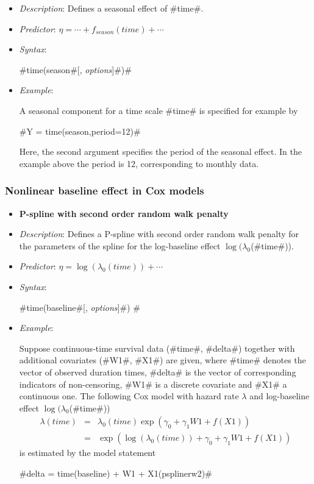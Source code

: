 \begin{itemize}
\item[] {\em Description}: Defines a seasonal effect of #time#.
\item[] {\em Predictor}: $\eta =  \cdots + f_{season}(time) + \cdots $
\item[] {\em Syntax}:

#time(season#[, {\em options}]#)#
\item[] {\em Example}:

A seasonal component for a time scale #time# is specified for
example by

#Y = time(season,period=12)#

Here, the second argument specifies the period of the seasonal
effect. In the example above the period is 12, corresponding to
monthly data.
\end{itemize}

\subsubsection*{Nonlinear baseline effect in Cox models}

\begin{itemize}
\item[]{\bf\sffamily P-spline with second order random walk
penalty}

\item[] {\em Description}: Defines a P-spline with second order
random walk penalty for the parameters of the spline for the
log-baseline effect $\log(\lambda_0$(#time#)). \item[] {\em
Predictor}: $\eta = \log(\lambda_0(time)) + \cdots$ \item[] {\em
Syntax}:

#time(baseline#[, {\em options}]#) # \item[] {\em Example}:

Suppose continuous-time survival data (#time#, #delta#) together
with additional covariates (#W1#, #X1#) are given, where #time#
denotes the vector of observed duration times, #delta# is the vector
of corresponding indicators of non-censoring, #W1# is a discrete
covariate and #X1# a continuous one. The following Cox model with
hazard rate $\lambda$ and log-baseline effect
$\log(\lambda_0$(#time#))
\begin{eqnarray*}
 \lambda(time) & = & \lambda_0(time)\exp (\gamma_0 + \gamma_1 W1 + f(X1))\\
 & = & \exp\left(\log(\lambda_0(time)) + \gamma_0 + \gamma_1 W1 + f(X1)\right)
\end{eqnarray*}
is estimated by the model statement

#delta = time(baseline) + W1 + X1(psplinerw2)#

\end{itemize}

